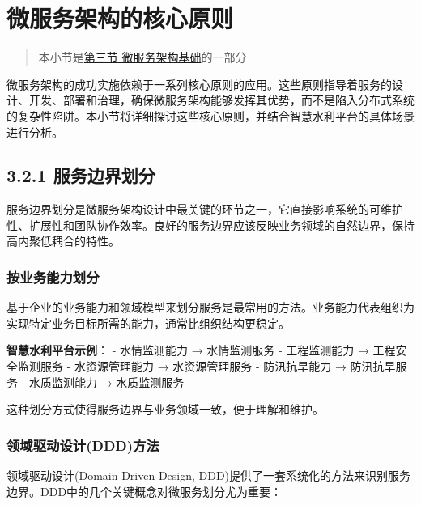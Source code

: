 \section{微服务架构的核心原则}\label{ux5faeux670dux52a1ux67b6ux6784ux7684ux6838ux5fc3ux539fux5219}

\begin{quote}
本小节是\href{section03-03.md}{第三节 微服务架构基础}的一部分
\end{quote}

微服务架构的成功实施依赖于一系列核心原则的应用。这些原则指导着服务的设计、开发、部署和治理，确保微服务架构能够发挥其优势，而不是陷入分布式系统的复杂性陷阱。本小节将详细探讨这些核心原则，并结合智慧水利平台的具体场景进行分析。

\subsection{3.2.1
服务边界划分}\label{ux670dux52a1ux8fb9ux754cux5212ux5206}

服务边界划分是微服务架构设计中最关键的环节之一，它直接影响系统的可维护性、扩展性和团队协作效率。良好的服务边界应该反映业务领域的自然边界，保持高内聚低耦合的特性。

\subsubsection{按业务能力划分}\label{ux6309ux4e1aux52a1ux80fdux529bux5212ux5206}

基于企业的业务能力和领域模型来划分服务是最常用的方法。业务能力代表组织为实现特定业务目标所需的能力，通常比组织结构更稳定。

\textbf{智慧水利平台示例}： - 水情监测能力 → 水情监测服务 - 工程监测能力
→ 工程安全监测服务 - 水资源管理能力 → 水资源管理服务 - 防汛抗旱能力 →
防汛抗旱服务 - 水质监测能力 → 水质监测服务

这种划分方式使得服务边界与业务领域一致，便于理解和维护。

\subsubsection{领域驱动设计(DDD)方法}\label{ux9886ux57dfux9a71ux52a8ux8bbeux8ba1dddux65b9ux6cd5}

领域驱动设计(Domain-Driven Design,
DDD)提供了一套系统化的方法来识别服务边界。DDD中的几个关键概念对微服务划分尤为重要：

